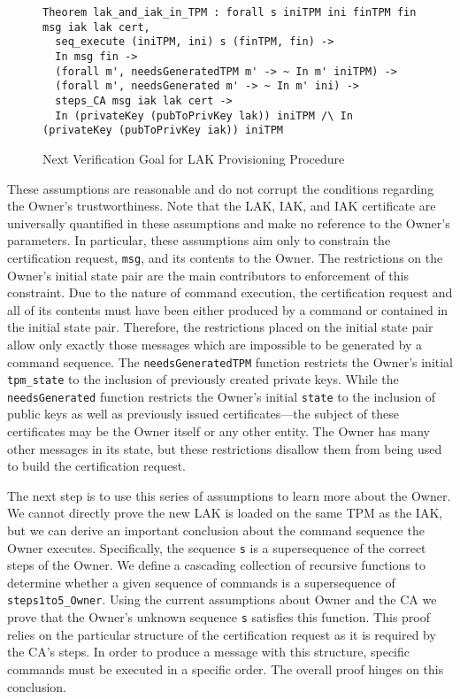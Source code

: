 \documentclass[runningheads]{llncs}
\begin{document}
\begin{figure}[hbtp]
\begin{lstlisting}[language=Coq]
Theorem lak_and_iak_in_TPM : forall s iniTPM ini finTPM fin msg iak lak cert,
  seq_execute (iniTPM, ini) s (finTPM, fin) -> 
  In msg fin ->
  (forall m', needsGeneratedTPM m' -> ~ In m' iniTPM) ->
  (forall m', needsGenerated m' -> ~ In m' ini) ->
  steps_CA msg iak lak cert ->
  In (privateKey (pubToPrivKey lak)) iniTPM /\ In (privateKey (pubToPrivKey iak)) iniTPM
\end{lstlisting}
\caption{Next Verification Goal for LAK Provisioning Procedure}
\label{fig:lak_goal}
\end{figure}

These assumptions are reasonable and do not corrupt the conditions
regarding the Owner's trustworthiness. Note that the LAK, IAK, and IAK
certificate are universally quantified in these assumptions and make
no reference to the Owner's parameters. In particular, these
assumptions aim only to constrain the certification request,
\verb|msg|, and its contents to the Owner.  The restrictions on the
Owner's initial state pair are the main contributors to enforcement of
this constraint. Due to the nature of command execution, the
certification request and all of its contents must have been either
produced by a command or contained in the initial state pair.
Therefore, the restrictions placed on the initial state pair allow
only exactly those messages which are impossible to be generated by a
command sequence.  The \verb|needsGeneratedTPM| function restricts the
Owner's initial \verb|tpm_state| to the inclusion of previously
created private keys. While the \verb|needsGenerated| function
restricts the Owner's initial \verb|state| to the inclusion of public
keys as well as previously issued certificates---the subject of these
certificates may be the Owner itself or any other entity.  The Owner
has many other messages in its state, but these restrictions disallow
them from being used to build the certification request.

The next step is to use this series of assumptions to learn more about
the Owner. We cannot directly prove the new LAK is loaded on the same
TPM as the IAK, but we can derive an important conclusion about the
command sequence the Owner executes. Specifically, the sequence
\verb|s| is a supersequence of the correct steps of the Owner.  We
define a cascading collection of recursive functions to determine
whether a given sequence of commands is a supersequence of
\verb|steps1to5_Owner|.  Using the current assumptions about Owner and
the CA we prove that the Owner's unknown sequence \verb|s| satisfies
this function. This proof relies on the particular structure of the
certification request as it is required by the CA's steps. In order to
produce a message with this structure, specific commands must be
executed in a specific order.  The overall proof hinges on this
conclusion.
\end{document}
